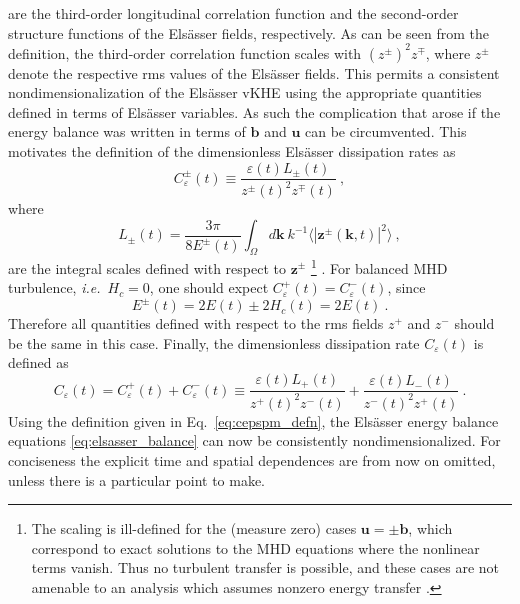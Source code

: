 \documentclass[aps,pre,onecolumn,superscriptaddress,notitlepage]{revtex4-1}
\newcommand{\Ceps}{C_\varepsilon}
\newcommand{\vep}{\varepsilon}
\renewcommand{\vec}[1]{\bm{#1}}
\newcommand{\vk}{\vec{k}}
\newcommand{\beq}{\begin{equation}}
\newcommand{\eeq}{\end{equation}}
\begin{document}
are the third-order longitudinal correlation function and the
second-order structure functions of the Els\"{a}sser fields, respectively. 
As can be seen from the definition, the third-order correlation function
scales with $(z^\pm)^2z^\mp$, where $z^\pm$ denote the respective 
rms values of the Els\"asser fields. This permits a consistent nondimensionalization
of the Els\"asser vKHE using the appropriate quantities 
defined in terms of Els\"asser variables. As such the complication that 
arose if the energy balance was written in terms of $\vec{b}$ and $\vec{u}$
can be circumvented.  
This motivates the definition of the dimensionless Els\"asser dissipation rates 
as
\beq
\Ceps^\pm(t) \equiv \frac{\vep(t) L_{\pm}(t)}{z^\pm(t)^2 z^\mp(t)} \ ,
\label{eq:cepspm_defn}
\eeq
where 
\beq
L_{\pm}(t)=\frac{3\pi}{8E^\pm(t)} \int_\Omega d \vk  \ k^{-1} \langle |\vec{z}^\pm(\vk,t)|^2 \rangle \ ,
\eeq
are the integral scales defined with respect to $\vec{z}^\pm$
\footnote{The scaling is ill-defined for the 
(measure zero) cases $\vec{u} = \pm \vec{b}$,
which correspond to exact solutions to the MHD equations where
the nonlinear terms vanish. Thus no turbulent transfer is possible,
and these cases are not amenable to an analysis
which assumes nonzero energy transfer \cite{Politano98}.} 
.
For balanced MHD turbulence, {\em i.e.}~$H_c=0$, one should expect $\Ceps^+(t) = \Ceps^-(t)$, since
\beq
E^\pm(t) = 2E(t)\pm 2H_c(t) = 2E(t)  \ .
\eeq
Therefore all quantities defined with respect to the rms fields $z^+$ and
$z^-$ should be the same in this case.
Finally, the dimensionless dissipation rate $\Ceps(t)$ is defined as
\beq
\Ceps(t) = \Ceps^+(t) + \Ceps^-(t) \equiv  \frac{\vep(t) L_+(t)}{{z^+(t)}^2 z^-(t)} + \frac{\vep(t) L_-(t)}{{z^-(t)}^2 z^+(t)} \ .
\label{eq:ceps_defn}
\eeq
Using the definition given in Eq.~\eqref{eq:cepspm_defn},
the Els\"asser energy balance equations \eqref{eq:elsasser_balance}
can now be consistently nondimensionalized. 
For conciseness the explicit time and spatial dependences 
are from now on omitted, unless there is a particular point to make. 
\end{document}
